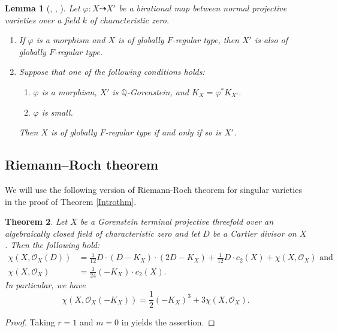 \documentclass[12pt]{amsart}
\def\phi{\varphi}
\newcommand{\Q}{\mathbb{Q}}
\newcommand{\sO}{\mathcal{O}}
\theoremstyle{plain}
\newtheorem{thm}{Theorem}[section]
\newtheorem{lem}[thm]{Lemma}
\theoremstyle{definition}
\theoremstyle{remark}
\newtheorem{defn and notation}[thm]{Definition and Notation}
\theoremstyle{plain}
\begin{document}
\begin{lem}[\textup{\cite[Corollary 6.4]{SS10}, \cite[Lemma 2.7]{GT}, \cite[Lemma 2.14]{GOST}}]\label{lem:crepant and GFR}\label{lem:small and GFR}
Let $\phi\colon X\dasharrow X'$ be a birational map between normal projective varieties over a field $k$ of characteristic zero. 
\begin{enumerate}[label=$(\arabic*)$]
\item 
If $\phi$ is a morphism and $X$ is of globally $F$-regular type, then $X'$ is also of globally $F$-regular type. 
\item 
Suppose that one of the following conditions holds: 
\begin{enumerate}[label=\textup{(\roman*)}]
\item 
$\phi$ is a morphism, $X'$ is $\Q$-Gorenstein, and $K_X=\phi^{*}K_{X'}$. 
\item 
$\phi$ is small. 
\end{enumerate}
Then $X$ is of globally $F$-regular type if and only if so is $X'$.
\end{enumerate}
\end{lem}

\subsection{Riemann--Roch theorem}
We will use the following version of Riemann-Roch theorem for singular varieties in the proof of Theorem \ref{Introthm}. 
\begin{thm}
    Let $X$ be a Gorenstein terminal projective threefold over an algebraically closed field of characteristic zero and let $D$ be a Cartier divisor on $X$.
    Then the following hold:
    \begin{align*}
        \chi(X,\sO_X(D))&=\frac{1}{12}D\cdot (D-K_X)\cdot (2D-K_X)+\frac{1}{12}D \cdot c_2(X)+\chi(X,\sO_X)\,\,\text{and}\,\, \\
        \chi(X,\sO_X)&=\frac{1}{24}(-K_X) \cdot c_2(X).
    \end{align*}
    In particular, we have
    \begin{equation}\label{RR for -K}
        \chi(X,\sO_X(-K_X))=\frac{1}{2}(-K_X)^3+3\chi(X,\sO_X).
    \end{equation}
\end{thm}
\begin{proof}
    Taking $r=1$ and $m=0$ in \cite[Corollary 10.3]{Reid(Young)} yields the assertion. 
\end{proof}
\end{document}
